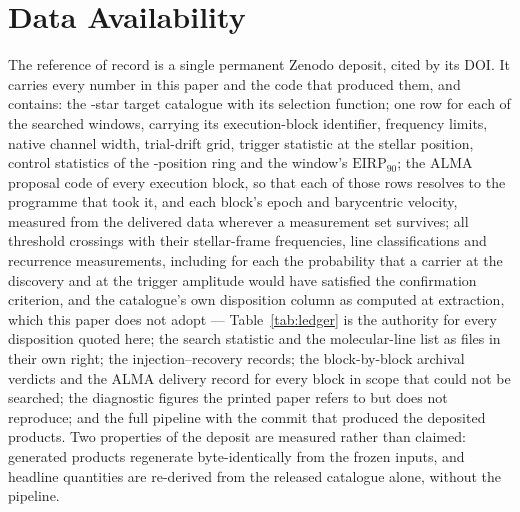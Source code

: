 \section*{Data Availability}
\label{sec:data}
The reference of record is a single permanent Zenodo deposit, cited by its
DOI. It carries every number in this paper and the code that produced them,
and contains: the \NStars-star target catalogue with its selection
function; one row for each of the \NWindows{} searched windows, carrying
its execution-block identifier, frequency limits,
native channel width, trial-drift grid, trigger statistic at the stellar
position, control statistics of the \NCtrl-position ring and the window's
$\mathrm{EIRP}_{90}$; the ALMA proposal code of every execution block, so
that each of those rows resolves to the programme that took it, and each
block's epoch and barycentric velocity, measured from the delivered data
wherever a measurement set survives; all \EvNCrossRaw{} threshold crossings
with their stellar-frame frequencies, line classifications and recurrence
measurements, including for each the probability that a carrier at the
discovery and at the trigger amplitude would have satisfied the confirmation
criterion, and the catalogue's own disposition column as computed at
extraction, which this paper does not adopt --- Table~\ref{tab:ledger} is the
authority for every disposition quoted here;
the search statistic and the molecular-line list as
files in their own right; the injection--recovery records; the block-by-block
archival verdicts and the ALMA delivery record for every block in scope
that could not be searched; the diagnostic figures the printed paper refers
to but does not reproduce; and the full pipeline with the
commit that produced the deposited products. Two properties of the deposit are
measured rather than claimed: \NRegenProducts{} generated products
regenerate byte-identically from the frozen inputs, and \NReproChecks{}
headline quantities are re-derived from the released catalogue alone,
without the pipeline.

